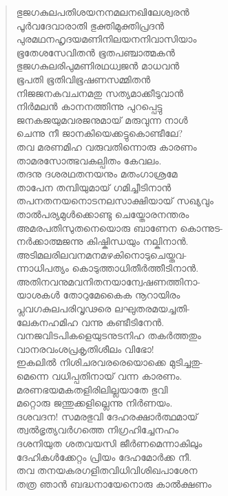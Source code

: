 \begin{verse}
ഭുജഗകുലപതിശയനനമലനഖിലേശ്വരന്‍\\
പൂര്‍വദേവാരാതി ഭുക്തിമുക്തിപ്രദന്‍\\
പുരമഥനഹൃദയമണിനിലയനനിവാസിയാം\\
ഭൂതേശസേവിതന്‍ ഭൂതപഞ്ചാത്മകന്‍\\
ഭുജഗകുലരിപുമണിരഥധ്വജന്‍ മാധവന്‍\\
ഭൂപതി ഭൂതിവിഭൂഷണസമ്മിതന്‍\\
നിജജനകവചനമതു സത്യമാക്കീടുവാന്‍\\
നിര്‍മലന്‍ കാനനത്തിന്നു പുറപ്പെട്ടു\\
ജനകജയുമവരജനുമായ് മരുവുന്ന നാള്‍\\
ചെന്നു നീ ജാനകിയെക്കട്ടുകൊണ്ടീലേ?\\
തവ മരണമിഹ വരുവതിന്നൊരു കാരണം\\
താമരസോത്ഭവകല്പിതം കേവലം.\\
തദനു ദശരഥതനയനും മതംഗാശ്രമേ\\
താപേന തമ്പിയുമായ് ഗമിച്ചീടിനാന്‍\\
തപനതനയനൊടനലസാക്ഷിയായ് സഖ്യവും\\
താല്‍പര്യമുള്‍ക്കൊണ്ടു ചെയ്തോരനന്തരം\\
അമരപതിസുതനെയൊരു ബാണേന കൊന്നുട-\\
നര്‍ക്കാത്മജന്നു കിഷ്കിന്ധയും നല്കിനാന്‍.\\
അടിമലരിലവനമനമഴകിനൊടുചെയ്തവ-\\
ന്നാധിപത്യം കൊടുത്താധിതീര്‍ത്തീടിനാന്‍.\\
അതിനവനുമവനിതനയാന്വേഷണത്തിനാ-\\
യാശകള്‍ തോറുമേകൈക നൂറായിരം\\
പ്ലവഗകുലപരിവൃഢരെ ലഘുതരമയച്ചതി-\\
ലേകനഹമിഹ വന്നു കണ്ടീടിനേന്‍.\\
വനജവിടപികളെയുടനുടനിഹ തകര്‍ത്തതും\\
വാനരവംശപ്രകൃതിശീലം വിഭോ!\\
ഇകലില്‍ നിശിചരവരരെയൊക്കെ മുടിച്ചതു-\\
മെന്നെ വധിപ്പതിനായ് വന്ന കാരണം.\\
മരണഭയമകതളിരിലില്ലയാതേ ഭുവി\\
മറ്റൊരു ജന്തുക്കളില്ലെന്നു നിര്‍ണയം.\\
ദശവദന! സമരഭുവി ദേഹരക്ഷാര്‍ത്ഥമായ്\\
ത്വല്‍ഭൃത്യവര്‍ഗത്തെ നിഗ്രഹിച്ചേനഹം\\
ദശനിയുത ശതവയസി ജീര്‍ണമെന്നാകിലും\\
ദേഹികള്‍ക്കേറ്റം പ്രിയം ദേഹമോര്‍ക്ക നീ.\\
തവ തനയകരഗളിതവിധിവിശിഖപാശേന\\
തത്ര ഞാന്‍ ബദ്ധനായേനൊരു കാല്‍ക്ഷണം\\

\end{verse}
